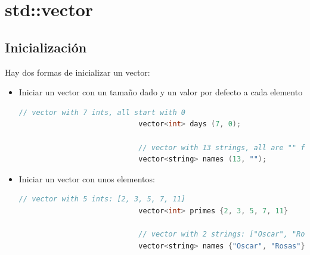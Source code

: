 \documentclass[12pt, fleqn]{report}                             %
\theoremstyle{break}                                            %
\begin{document}
        \clearpage
        \section{std::vector}

            \subsection{Inicialización}

                Hay dos formas de inicializar un vector:
                \begin{itemize}
                    \item Iniciar un vector con un tamaño dado y un valor por defecto a cada elemento
                        \begin{lstlisting}[language=C++, gobble=28]
                            // vector with 7 ints, all start with 0
                            vector<int> days (7, 0);        

                            // vector with 13 strings, all are "" for now
                            vector<string> names (13, "");  
                        \end{lstlisting}

                    \item Iniciar un vector con unos elementos:
                        \begin{lstlisting}[language=C++, gobble=28]
                            // vector with 5 ints: [2, 3, 5, 7, 11]
                            vector<int> primes {2, 3, 5, 7, 11}     

                            // vector with 2 strings: ["Oscar", "Rosas"]
                            vector<string> names {"Oscar", "Rosas"} 
                        \end{lstlisting}
                \end{itemize}

\end{document}
